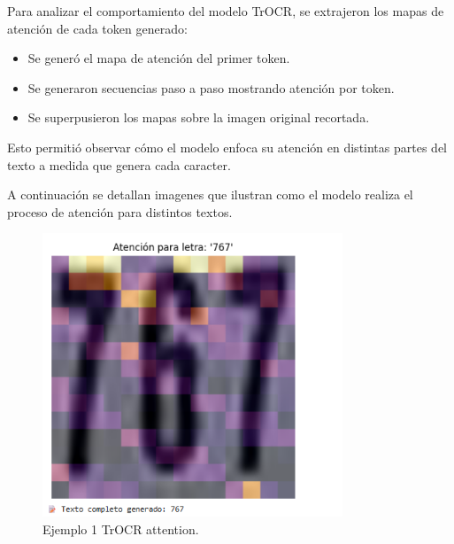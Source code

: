 \documentclass[12pt]{article}
\begin{document}
Para analizar el comportamiento del modelo TrOCR, se extrajeron los mapas de atención de cada token generado:

\begin{itemize}
    \item Se generó el mapa de atención del primer token.
    \item Se generaron secuencias paso a paso mostrando atención por token.
    \item Se superpusieron los mapas sobre la imagen original recortada.
\end{itemize}

Esto permitió observar cómo el modelo enfoca su atención en distintas partes del texto a medida que genera cada caracter.

A continuación se detallan imagenes que ilustran como el modelo realiza el proceso de atención para distintos textos.

\begin{figure}[H]
    \centering
    \includegraphics[width=0.8\textwidth]{../reports/figures/attention_heatmap3.png} 
    \caption{Ejemplo 1 TrOCR attention.}
    \label{fig:attention1}
\end{figure}

\clearpage  %
\end{document}
